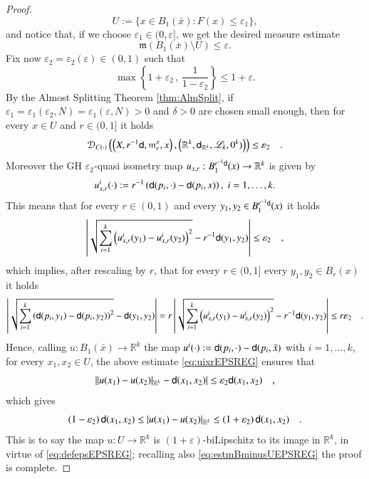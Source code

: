\documentclass[11pt,reqno]{amsart}
\newcommand{\mm}{\mathfrak m}
\newcommand{\sfd}{{\sf d}}
\newcommand{\LL}{\mathscr{L}}
\newcommand{\R}{\mathbb{R}}
\newcommand{\DC}{\mathcal D_{C(\cdot)}}
\newcommand{\vare}{\varepsilon}
\theoremstyle{definition}
\theoremstyle{remark}
\theoremstyle{remark}
\theoremstyle{remark}
\theoremstyle{remark}
\theoremstyle{remark}
\theoremstyle{remark}
\theoremstyle{remark}
\begin{document}
\begin{proof}
$$
U:=\{x \in  B_1(\bar{x}) : F(x)\leq \vare_{1} \},
$$
and notice that, if we choose $\vare_{1}\in (0, \vare]$, we get the desired measure estimate
\begin{equation}\label{eq:estmBminusUEPSREG}
\mm(B_{1}(\bar{x})\setminus U) \leq \vare.
\end{equation}
 Fix now $\varepsilon_2=\vare_{2}(\vare)\in (0,1)$  such that  
\begin{equation}\label{eq:defepsEPSREG}
\max \left\{1+\vare_2\, , \, \frac{1}{1-\vare_2} \right\} \leq 1+\vare.
\end{equation}
By  the Almost Splitting Theorem \ref{thm:AlmSplit}, if $\vare_{1}=\vare_{1}(\vare_{2},N)=\vare_{1}(\vare,N)>0$  and $\delta>0$ are chosen small enough, then  for every $x \in  U$ and $r \in (0,1]$  it holds
\begin{equation}\label{eq:DXRkEPSREG}
\DC \left( \left(X, r^{-1} \sfd, \mm^x_r, x \right), \left( \R^k ,\sfd_{\R^k},\LL_k, 0^k)  \right) \right) \leq  \vare_2 \quad . 
\end{equation}
Moreover the  GH $\vare_2$-quasi isometry map $u_{x,r}:B^{r^{-1}\sfd}_{1}(x) \to \R^k$ is  given by 
$$u^i_{x,r}(\cdot):=r^{-1}\left( \sfd(p_i,\cdot)- \sfd(p_i,x)\right), \; i=1,\ldots,k.$$
This means that for every $r \in (0,1)$ and every $y_1,y_2 \in B^{r^{-1}\sfd}_{1}(x)$  it holds
$$ \left| \sqrt{\sum_{i=1}^k  \left(u^i_{x,r} (y_1)- u^i_{x,r}(y_2) \right)^2} -  r^{-1} \sfd (y_1,y_2)  \right|  \leq  \vare_2 \quad ,$$
which implies, after rescaling by $r$, that for every $r \in (0,1]$ every $y_1,y_2 \in B_{r}(x)$  it holds
\begin{equation} \label{eq:uixrEPSREG}
\left| \sqrt{\sum_{i=1}^k  \left( \sfd(p_i,y_1)- \sfd(p_i,y_2) \right)^2} -   \sfd (y_1,y_2)  \right| = r  \left| \sqrt{\sum_{i=1}^k  \left(u^i_{x,r} (y_1)- u^i_{x,r}(y_2) \right)^2} -  r^{-1} \sfd (y_1,y_2)  \right|  \leq r \vare_2\quad.
\end{equation}
Hence, calling $u: B_1(\bar{x})\to \R^k$ the map $u^i(\cdot):=\sfd(p_i,\cdot)-\sfd(p_i,\bar{x})$ with $i=1,\ldots,k$,  for every $x_1,x_2 \in U$, the above estimate \eqref{eq:uixrEPSREG} ensures that
$$\left|  | u(x_1)-u(x_2)|_{\R^k} - \sfd(x_1,x_2) \right| \leq \vare_2 \sfd(x_1,x_2) \quad, $$
which gives
\begin{equation}\label{eq:uLipEPSREG}
(1-\vare_2) \,  \sfd(x_1,x_2) \leq  | u(x_1)-u(x_2)|_{\R^k} \leq  (1+\vare_2) \, \sfd(x_1,x_2) \quad.
\end{equation}
This is to say the map $u: U\to \R^{k}$ is $(1+\vare)$-biLipschitz to its image in $\R^k$, in virtue of \eqref{eq:defepsEPSREG}; recalling also \eqref{eq:estmBminusUEPSREG} the proof is complete.
 \end{proof}
\end{document}
